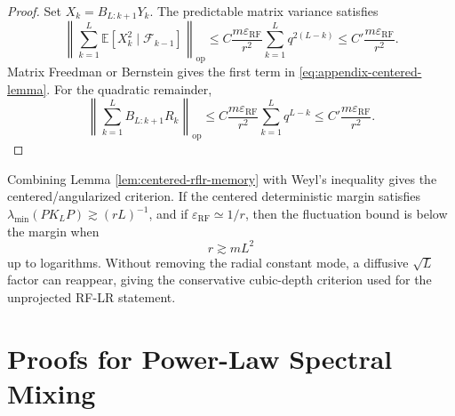 \documentclass{article}
\newcommand{\E}{\mathbb E}
\newcommand{\op}{\mathrm{op}}
\newcommand{\eps}{\varepsilon}
\newcommand{\RF}{\mathrm{RF}}
\begin{document}
\begin{proof}
Set \(X_k=B_{L:k+1}Y_k\). The predictable matrix variance satisfies
\begin{equation}
\left\|\sum_{k=1}^{L}\E[X_k^2\mid\mathcal F_{k-1}]\right\|_{\op}
\le
C\frac{m\eps_{\RF}}{r^2}\sum_{k=1}^{L}q^{2(L-k)}
\le C'\frac{m\eps_{\RF}}{r^2}.
\end{equation}
Matrix Freedman or Bernstein gives the first term in \eqref{eq:appendix-centered-lemma}. For the quadratic remainder,
\begin{equation}
\left\|\sum_{k=1}^{L}B_{L:k+1}R_k\right\|_{\op}
\le
C\frac{m\eps_{\RF}}{r^2}\sum_{k=1}^{L}q^{L-k}
\le C'\frac{m\eps_{\RF}}{r^2}.
\end{equation}
\end{proof}

Combining Lemma \ref{lem:centered-rflr-memory} with Weyl's inequality gives the centered/angularized criterion. If the centered deterministic margin satisfies \(\lambda_{\min}(PK_LP)\gtrsim (rL)^{-1}\), and if \(\eps_{\RF}\simeq 1/r\), then the fluctuation bound is below the margin when
\begin{equation}
r\gtrsim mL^2
\label{eq:appendix-centered-L2}
\end{equation}
up to logarithms. Without removing the radial constant mode, a diffusive \(\sqrt L\) factor can reappear, giving the conservative cubic-depth criterion used for the unprojected RF-LR statement.

\section{Proofs for Power-Law Spectral Mixing}
\label{app:powerlaw-proofs}
\end{document}
